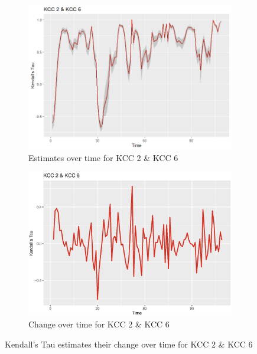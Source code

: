  \begin{figure}[H]
\centering
\begin{subfigure}{.45\textwidth}
  \centering
  \includegraphics[width=\linewidth]{figures/tau_over_time_kcc_26.png}
  \caption{Estimates over time for KCC 2 \& KCC 6}
  \label{fig:tau_over_time_kcc_26}
\end{subfigure}
\begin{subfigure}{.45\textwidth}
  \centering
  \includegraphics[width=\linewidth]{figures/diff_tau_over_time_kcc_26.eps}
  \caption{Change over time for KCC 2 \& KCC 6}
  \label{fig:diff_tau_over_time_kcc_26}
\end{subfigure}
\caption{Kendall's Tau estimates their change over time for KCC 2 \& KCC 6}
\label{fig:tau_estimates_kcc_26}
\end{figure}



